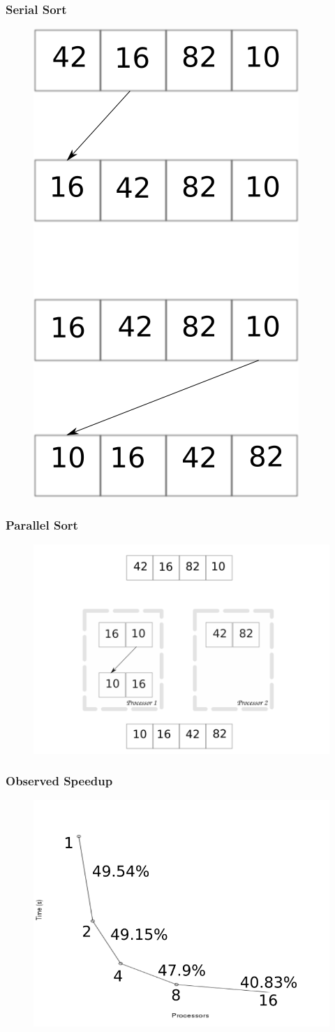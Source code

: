 
\begin{frame}
		\frametitle{Serial Sort}
		\begin{figure}
				\includegraphics[width=0.3\linewidth]{figures/diagrams/sort/serialsort}
		\end{figure}	
\end{frame}

\begin{frame}
		\frametitle{Parallel Sort}
		\begin{figure}
				\includegraphics[width=0.8\linewidth]{figures/diagrams/sort/parallelsort}
		\end{figure}	
\end{frame}

\begin{frame}
		\frametitle{Observed Speedup}
		\begin{figure}
				\includegraphics[width=0.7\linewidth]{figures/diagrams/omp/reduction}
		\end{figure}
\end{frame}

